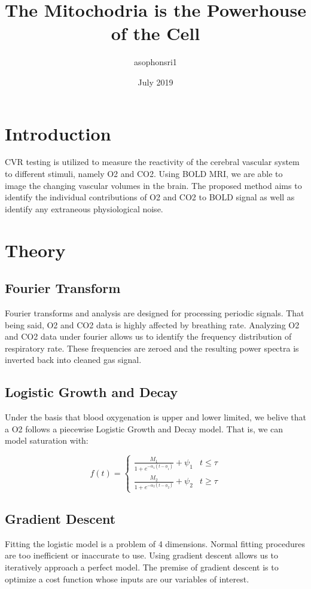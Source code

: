 \documentclass{article}
\title{The Mitochodria is the Powerhouse of the Cell}
\author{asophonsri1 }
\date{July 2019}
\begin{document}
\maketitle

\section*{Introduction}
  CVR testing is utilized to measure the reactivity of the cerebral vascular system to different stimuli, namely O2 and CO2. Using BOLD MRI, we are able to image the changing vascular volumes in the brain. The proposed method aims to identify the individual contributions of O2 and CO2 to BOLD signal as well as identify any extraneous physiological noise.

\section*{Theory}
\subsection*{Fourier Transform}
  Fourier transforms and analysis are designed for processing periodic signals. That being said, O2 and CO2 data is highly affected by breathing rate. Analyzing O2 and CO2 data under fourier allows us to identify the frequency distribution of respiratory rate. These frequencies are zeroed and the resulting power spectra is inverted back into cleaned gas signal.
\subsection*{Logistic Growth and Decay}
  Under the basis that blood oxygenation is upper and lower limited, we belive that a O2 follows a piecewise Logistic Growth and Decay model. That is, we can model saturation with:

\begin{equation}
f(t)=\begin{cases}
    \frac{M_1}{1+e^{-\alpha_1(t-\phi_1)}}  + \psi_1 & t\leq \tau\\[.4em]
    \frac{M_2}{1+e^{-\alpha_2(t-\phi_2)}}  + \psi_2 & t\geq \tau
 \end{cases}
\end{equation}



\subsection*{Gradient Descent}
Fitting the logistic model is a problem of 4 dimensions. Normal fitting procedures are too inefficient or inaccurate to use. Using gradient descent allows us to iteratively approach a perfect model. The premise of gradient descent is to optimize a cost function whose inputs are our variables of interest.\\
\end{document}
